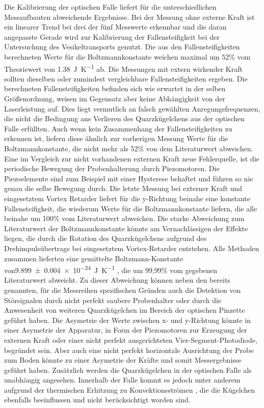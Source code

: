     Die Kalibrierung der optischen Falle liefert für die unterschiedlichen Messaufbauten abweichende Ergebnisse. Bei der Messung ohne externe Kraft ist ein linearer Trend bei drei der fünf Messwerte
    erkennbar und die daran angepasste Gerade wird zur Kalibrierung der Fallensteifigkeit bei der Untersuchung des Vesikeltransports genutzt. Die aus den Fallensteifigkeiten berechneten Werte für die
    Boltzmannkonstante weichen maximal um 52\% vom Theoriewert von \SI{1.38}{\joule\per\kelvin} \cite{national_institute_of_standars_and_technology_nist_nodate} ab.\newline
    Die Messungen mit extern wirkender Kraft sollten dieselben oder zumindest vergleichbare Fallensteifigkeiten ergeben. Die berechneten Fallensteifigkeiten befinden sich wie erwartet in der selben 
    Größenordnung, weisen im Gegensatz aber keine Abhängigkeit von der Laserleistung auf. Dies liegt vermutlich an falsch gewählten Anregungsfrequenzen, die nicht 
    die Bedingung ans Verlieren des Quarzkügelchens aus der optischen Falle erfüllten. Auch wenn kein Zusammenhang der Fallensteifigkeiten zu erkennen ist, liefern diese ähnlich zur vorherigen Messung Werte 
    für die Boltzmannkonstante, die nicht mehr als 52\% von dem Literaturwert abweichen. Eine im Vergleich zur nicht vorhandenen externen Kraft neue Fehlerquelle, ist die periodische Bewegung der 
    Probenhalterung durch Piezomotoren. Die Piezoelemente sind zum Beispiel mit einer Hysterese behaftet und führen so nie genau die selbe Bewegung durch.\newline
    Die letzte Messung bei externer Kraft und eingesetztem Vortex Retarder liefert für die y-Richtung beinahe eine konstante Fallensteifigkeit, die wiederum Werte für die Boltzmannkonstante liefern, die alle 
    beinahe um 100\% vom Literaturwert abweichen. Die starke Abweichung zum Literaturwert der Boltzmannkonstante könnte am Vernachlässigen der Effekte liegen, die durch die Rotation des Quarzkügelchens 
    aufgrund des Drehimpulsübertrags bei eingesetztem Vortex-Retarder entstehen.\newline
    Alle Methoden zusammen lieferten eine gemittelte Boltzmann-Konstante von\newline \SI{9.899(4)e-24}{\joule\per\kelvin} , die um 99,99\% vom gegebenen Literaturwert abweicht. Zu dieser Abweichung können neben den 
    bereits genannten, für die Messreihen spezifischen Gründen auch die Detektion von Störsignalen durch nicht perfekt saubere Probenhalter oder durch die Anwesenheit von weiteren Quarzkügelchen im Bereich der 
    optischen Pinzette geführt haben. Die Asymetrie der Werte zwischen x- und y-Richtung könnte in einer Asymetrie der Apparatur, in Form der Piezomotoren zur Erzeugung der externen Kraft oder einer nicht 
    perfekt ausgerichteten Vier-Segment-Photodiode, begründet sein. Aber auch eine nicht perfekt horizontale Ausrichtung der Probe zum Boden könnte zu einer Asymetrie der Kräfte und somit Messergebnisse 
    geführt haben.  Zusätzlich werden die Quarzkügelchen in der optischen Falle als unabhängig angesehen. Innerhalb der Falle kommt es jedoch unter anderem aufgrund der thermischen Erhitzung zu 
    Konvektionsströmen \cite{hosokawa_convection_2020}, die die Kügelchen ebenfalls beeinflussen und nicht berücksichtigt worden sind.  

